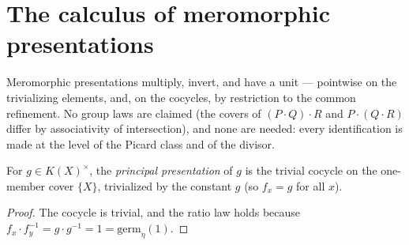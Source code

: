 \section{The calculus of meromorphic presentations}

Meromorphic presentations multiply, invert, and have a unit --- pointwise on the trivializing
elements, and, on the cocycles, by restriction to the common refinement. No group laws are
claimed (the covers of \((P \cdot Q) \cdot R\) and \(P \cdot (Q \cdot R)\) differ by
associativity of intersection), and none are needed: every identification is made at the level of
the Picard class and of the divisor.

\begin{definition}
  \label{pa-def:meromorphicPresentation_principal}
  \leanok

  For \(g \in K(X)^{\times}\), the \emph{principal presentation} of \(g\) is the trivial cocycle on
  the one-member cover \(\{X\}\), trivialized by the constant \(g\) (so \(f_x = g\) for all
  \(x\)).
\end{definition}
\begin{proof}
  \leanok
  The cocycle is trivial, and the ratio law holds because \(f_x \cdot f_y^{-1} = g \cdot g^{-1} =
  1 = \mathrm{germ}_\eta(1)\).
\end{proof}

